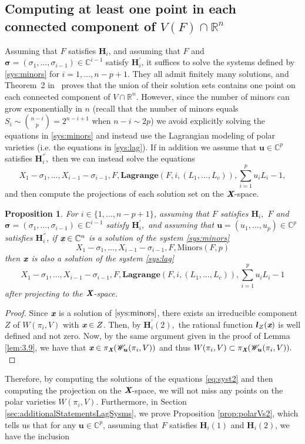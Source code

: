 \documentclass[a4paper]{article}
\def\Xb{\textit{\textbf{X}}}
\def\ub{{\bm u}}
\def\lb{{\bm l}}
\def\xb{\textit{\textbf{x}}}
\def\minors{\textrm{Minors}(F,p)}
\def\C{\mathbb{C}}
\def\R{\mathbb{R}}
\def\lagF{{\bm{Lagrange}}(F,i,(L_1,\hdots,L_c))}
\def\Wil{\mathscr{W}_{\ub}(\pi_i,V)}
\def\udl{\sum_{i=1}^pu_iL_i}
\newtheorem{prop}[theorem]{Proposition}
\begin{document}
\subsection{Computing at least one point in each connected component of $V(F) \cap \R^n$} 
%
Assuming that $F$ satisfies $\bm H_i$, and assuming that $F$ and $\bm \sigma = (\sigma_1,\hdots,\sigma_{i-1}) \in \C^{i-1}$ satisfy $\bm H_i^{'}$, it suffices to solve the systems defined by \eqref{sys:minors}
for $i=1,\dots,n-p+1$.  They all admit finitely many solutions, and
Theorem~2 in~\cite{EMP} proves that the union of their solution sets
contains one point on each connected component of $V \cap \R^n$. However, since the number of minors can grow exponentially in $n$ (recall that the number of minors equals $S_i \sim  \binom{n-i}{p}= 2^{n-i+1}$ when $n-i \sim 2p$)
we avoid explicitly solving the equations in \eqref{sys:minors} and instead use the Lagrangian modeling of polar varieties (i.e. the equations in \eqref{sys:lag}). If in addition we assume that $\ub \in \C^p$ satisfies $\bm H_i^{''},$ then we can instead solve the equations
%
\begin{equation}\label{eq:syst2}
X_1-\sigma_1,\dots,X_{i-1}-\sigma_{i-1}, F, \lagF ,\udl-1,
\end{equation}
%
and then compute the projections of each solution set on the $\Xb$-space. 
%
\begin{prop}\label{prop:correctness}
For $i\in\{1,\hdots,n-p+1\}$, assuming that $F$ satisfies $\bm H_i,$ $F$ and $\bm \sigma = (\sigma_1,\hdots,\sigma_{i-1}) \in \C^{i-1}$ satisfy $\bm H_i^{'},$ and assuming that $\ub = (u_1,\hdots,u_p) \in \C^p$ satisfies $\bm H_i^{''}$, if $\xb \in \C^n$ is a solution of the system \eqref{sys:minors}
\[
X_1 - \sigma_1,\hdots,X_{i-1} - \sigma_{i-1}, F, \minors  
\]
then $\xb$ is also a solution of the system \eqref{sys:lag}
\[
X_1 - \sigma_1,\hdots,X_{i-1} - \sigma_{i-1}, F,\lagF,\sum_{i=1}^p u_i L_i -1
\]
after projecting to the $\Xb$-space. 
\end{prop}
\begin{proof}
Since $\xb$ is a solution of $\eqref{sys:minors}$, there exists an irreducible component $Z$ of $W(\pi_i,V)$ with $\xb \in Z$. Then, by $\bm H_i^{'}(2),$ the rational function $\lb_Z(\xb)$ is well defined and not zero. Now, by the same argument given in the proof of Lemma \ref{lem:3.9}, we have that $\xb \in \pi_{\Xb} ( \Wil)$ and thus $W(\pi_i,V) \subset \pi_{\Xb} ( \Wil).$ 
\end{proof}
\noindent 
Therefore, by computing the solutions of the equations \eqref{eq:syst2} and then computing the projection on the $\Xb$-space, we will not miss any points on the polar varieties $W(\pi_i,V).$ Furthermore, in Section \ref{sec:additionalStatementsLagSysms}, we prove Proposition \ref{prop:polarVs2}, which tells us that for any $\ub \in \C^p$, assuming that $F$ satisfies $\bm H_i(1)$ and $\bm H_i(2)$, we have the inclusion 
\end{document}
